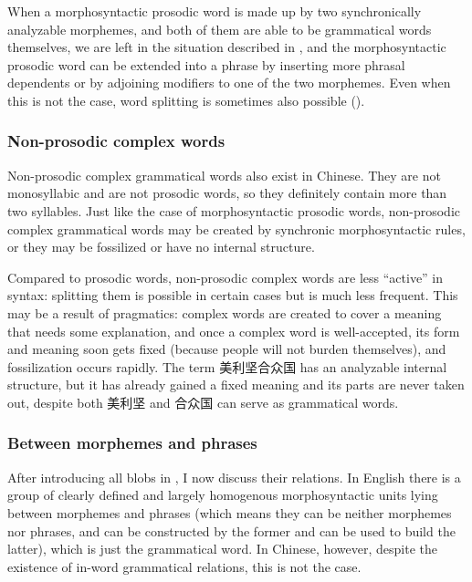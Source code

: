 \documentclass[UTF8, a4paper, oneside, scheme=plain]{ctexart}
\begin{document}
When a morphosyntactic prosodic word is made up by two synchronically analyzable morphemes,
and both of them are able to be grammatical words themselves,
we are left in the situation described in ,
and the morphosyntactic prosodic word can be extended into a phrase 
by inserting more phrasal dependents 
or by adjoining modifiers to one of the two morphemes.
Even when this is not the case,
word splitting is sometimes also possible ().

\subsubsection{Non-prosodic complex words}

Non-prosodic complex grammatical words also exist in Chinese.
They are not monosyllabic and are not prosodic words,
so they definitely contain more than two syllables. 
Just like the case of morphosyntactic prosodic words,
non-prosodic complex grammatical words 
may be created by synchronic morphosyntactic rules,
or they may be fossilized or have no internal structure.

Compared to prosodic words,
non-prosodic complex words are less ``active'' in syntax:
splitting them is possible in certain cases
but is much less frequent.
This may be a result of pragmatics:
complex words are created to cover a meaning that needs some explanation,
and once a complex word is well-accepted,
its form and meaning soon gets fixed 
(because people will not burden themselves),
and fossilization occurs rapidly.
The term 美利坚合众国 has an analyzable internal structure,
but it has already gained a fixed meaning 
and its parts are never taken out,
despite both 美利坚 and 合众国 can serve as grammatical words.

\subsubsection{Between morphemes and phrases}

After introducing all blobs in ,
I now discuss their relations.
In English there is a group of clearly defined and largely homogenous morphosyntactic units 
lying between morphemes and phrases
(which means they can be neither morphemes nor phrases,
and can be constructed by the former and can be used to build the latter),
which is just the grammatical word.
In Chinese, however, despite the existence of in-word grammatical relations,
this is not the case.
\end{document}
